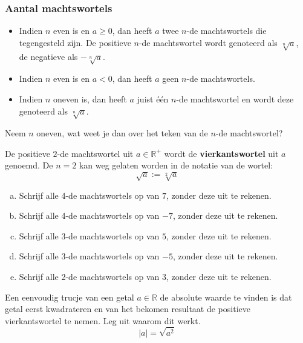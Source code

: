 \documentclass[12pt,twoside,a4paper]{article}
\begin{document}
\subsubsection*{Aantal machtswortels}
\begin{mdframed}
\begin{itemize}
  \item Indien $n$ even is en $a\geq 0$, dan heeft $a$ twee $n$-de machtswortels die tegengesteld zijn. De positieve $n$-de machtswortel wordt genoteerd als $\sqrt[n]{a}$, de negatieve als $-\sqrt[n]{a}$.
  \item Indien $n$ even is en $a < 0$, dan heeft $a$ geen $n$-de machtswortels.
  \item Indien $n$ oneven is, dan heeft $a$ juist één $n$-de machtswortel en wordt deze genoteerd als $\sqrt[n]{a}$.
\end{itemize}
\end{mdframed}

\begin{oefening}
Neem $n$ oneven, wat weet je dan over het teken van de $n$-de machtswortel?
\end{oefening}

De positieve $2$-de machtswortel uit $a\in\mathbb{R}^+$ wordt de {\bf vierkantswortel} uit $a$ genoemd. De $n=2$ kan weg gelaten worden in de notatie van de wortel:
$$\sqrt{a}:=\sqrt[2]{a}$$

\begin{oefening}
\begin{enumerate}[(a)]
  \item Schrijf alle 4-de machtswortels op van $7$, zonder deze uit te rekenen.
  \item Schrijf alle 4-de machtswortels op van $-7$, zonder deze uit te rekenen.
  \item Schrijf alle 3-de machtswortels op van $5$, zonder deze uit te rekenen.
  \item Schrijf alle 3-de machtswortels op van $-5$, zonder deze uit te rekenen.
  \item Schrijf alle 2-de machtswortels op van $3$, zonder deze uit te rekenen.
\end{enumerate}
\end{oefening}

\begin{oefening}
Een eenvoudig trucje van een getal $a\in\mathbb{R}$ de absolute waarde te vinden is dat getal eerst kwadrateren en van het bekomen resultaat de positieve vierkantswortel te nemen. Leg uit waarom dit werkt.
$$|a| = \sqrt{a^2}$$
\end{oefening}
\end{document}
